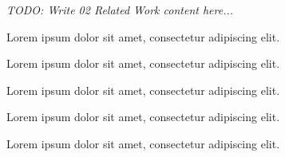\textit{TODO: Write 02 Related Work content here...}
\par Lorem ipsum dolor sit amet, consectetur adipiscing elit. \par Lorem ipsum dolor sit amet, consectetur adipiscing elit. \par Lorem ipsum dolor sit amet, consectetur adipiscing elit. \par Lorem ipsum dolor sit amet, consectetur adipiscing elit. \par Lorem ipsum dolor sit amet, consectetur adipiscing elit. 
